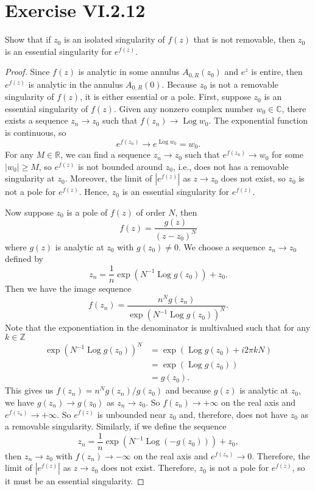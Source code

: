 \documentclass[12pt]{article}
\newenvironment{pbox}
    {\begin{lrbox}{\mybox}\begin{minipage}{0.98\textwidth}}
    {\end{minipage}\end{lrbox}\begin{center}\framebox[\textwidth]{\usebox{\mybox}}\end{center}}
\theoremstyle{definition}
\newcommand{\Z}{\mathbb{Z}}
\newcommand{\R}{\mathbb{R}}
\newcommand{\C}{\mathbb{C}}
\newcommand{\Log}{\operatorname{Log}}
\begin{document}
\newpage
\section{Exercise VI.2.12}
\begin{pbox}
    Show that if $z_0$ is an isolated singularity of $f(z)$ that is not removable, then $z_0$ is an essential singularity for $e^{f(z)}$.
\end{pbox}

\begin{proof}
    Since $f(z)$ is analytic in some annulus $A_{0,R}(z_0)$ and $e^z$ is entire, then $e^{f(z)}$ is analytic in the annulus $A_{0, R}(0)$. Because $z_0$ is not a removable singularity of $f(z)$, it is either essential or a pole. First, suppose $z_0$ is an essential singularity of $f(z)$. Given any nonzero complex number $w_0 \in \C$, there exists a sequence $z_n \to z_0$ such that $f(z_n) \to \Log w_0$. The exponential function is continuous, so
    \[
        e^{f(z_n)} \to e^{\Log w_0} = w_0.
    \]
    For any $M \in \R$, we can find a sequence $z_n \to z_0$ such that $e^{f(z_n)} \to w_0$ for some $|w_0| \geq M$, so $e^{f(z)}$ is not bounded around $z_0$, i.e., does not has a removable singularity at $z_0$. Moreover, the limit of $|e^{f(z)}|$ as $z \to z_0$ does not exist, so $z_0$ is not a pole for $e^{f(z)}$. Hence, $z_0$ is an essential singularity for $e^{f(z)}$.
    
    Now suppose $z_0$ is a pole of $f(z)$ of order $N$, then
    \[
        f(z) = \frac{g(z)}{(z - z_0)^N}
    \]
    where $g(z)$ is analytic at $z_0$ with $g(z_0) \ne 0$. We choose a sequence $z_n \to z_0$ defined by
    \[
        z_n = \frac1n \exp(N^{-1}\Log g(z_0)) + z_0.
    \]
    Then we have the image sequence
    \[
        f(z_n) 
            = \frac{n^N g(z_n)}{\exp(N^{-1}\Log g(z_0))^N}.
    \]
    Note that the exponentiation in the denominator is multivalued such that for any $k \in \Z$
    \begin{align*}
        \exp(N^{-1}\Log g(z_0))^N
            &= \exp(\Log g(z_0) + i2\pi kN) \\
            &= \exp(\Log g(z_0)) \\
            &= g(z_0). 
    \end{align*}
    This gives us $f(z_n) = n^N g(z_n)/g(z_0)$ and because $g(z)$ is analytic at $z_0$, we have $g(z_n) \to g(z_0)$ as $z_n \to z_0$. So $f(z_n) \to +\infty$ on the real axis and $e^{f(z_n)} \to +\infty$. So $e^{f(z)}$ is unbounded near $z_0$ and, therefore, does not have $z_0$ as a removable singularity. Similarly, if we define the sequence
    \[
        z_n = \frac1n \exp(N^{-1}\Log(-g(z_0))) + z_0,
    \]
    then $z_n \to z_0$ with $f(z_n) \to -\infty$ on the real axis and $e^{f(z_n)} \to 0.$ Therefore, the limit of $|e^{f(z)}|$ as $z \to z_0$ does not exist. Therefore, $z_0$ is not a pole for $e^{f(z)}$, so it must be an essential singularity.
    
    
    
\end{proof}
\end{document}
